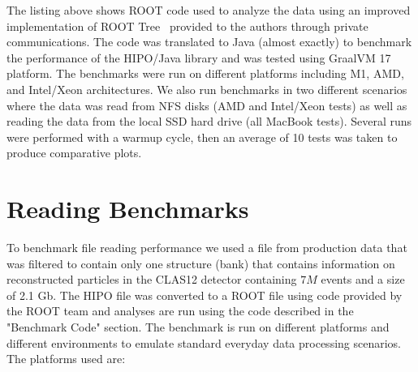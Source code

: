 \documentclass[preprint,12pt]{elsarticle}
\begin{document}

The listing above shows ROOT code used to analyze the data using an improved implementation of 
ROOT Tree~\cite{Blomer:2020usr} provided to the authors through private communications.
The code was translated to Java (almost exactly) to benchmark the performance of the HIPO/Java library and
was tested using GraalVM 17 platform.
The benchmarks were run on different platforms including M1, AMD, and Intel/Xeon architectures.
We also run benchmarks in two different scenarios where the data was read from NFS disks (AMD and Intel/Xeon tests)
as well as reading the data from the local SSD hard drive (all MacBook tests). Several runs were performed with a warmup cycle,
then an average of 10 tests was taken to produce comparative plots.


\section{Reading Benchmarks}
\indent

To benchmark file reading performance we used a file from production data that was filtered to contain
only one structure (bank) that contains information on reconstructed particles in the CLAS12 detector
containing $ 7 M$ events and a size of 2.1 Gb. The HIPO file was converted to a ROOT file using code 
provided by the ROOT team and analyses are run using the code described in the "Benchmark Code" section. 
The benchmark is run on different platforms and different environments to emulate standard everyday data 
processing scenarios. The platforms used are:
\end{document}
